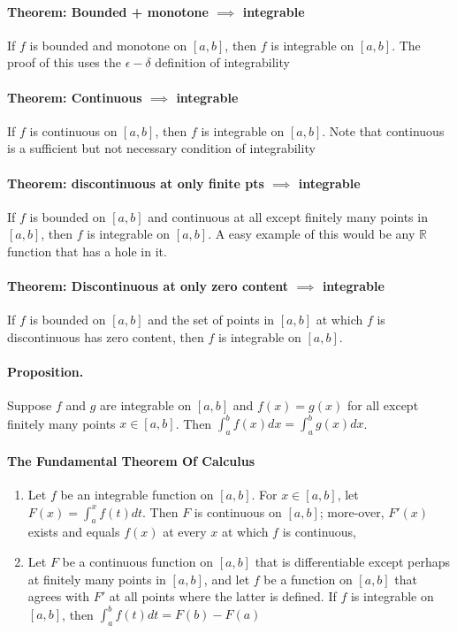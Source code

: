 \documentclass[11pt]{article}
\begin{document}
\paragraph{Theorem: Bounded + monotone $\implies$ integrable} If $f$ is bounded and monotone on $[a,b]$, then $f$ is integrable on $[a,b]$. The proof of this uses the $\epsilon-\delta$ definition of integrability

\paragraph{Theorem: Continuous $\implies$ integrable} If $f$ is continuous on $[a,b]$, then $f$ is integrable on $[a,b]$. Note that continuous is a sufficient but not necessary condition of integrability

\paragraph{Theorem: discontinuous at only finite pts $\implies$ integrable} If $f$ is bounded on $[a,b]$ and continuous at all except finitely many points in $[a,b]$, then $f$ is integrable on $[a,b]$. A easy example of this would be any $\mathbb{R}$ function that has a hole in it.

\paragraph{Theorem: Discontinuous at only zero content $\implies$ integrable} If $f$ is bounded on $[a,b]$ and the set of points in $[a,b]$ at which $f$ is discontinuous has zero content, then $f$ is integrable on $[a,b]$.

\paragraph{Proposition.} Suppose $f$ and $g$ are integrable on $[a,b]$ and $f(x) = g(x)$ for all except finitely many points $x\in [a,b]$. Then $\int_a^bf(x)dx = \int_a^bg(x)dx$. 

\paragraph{The Fundamental Theorem Of Calculus}
\begin{enumerate}
    \item Let $f$ be an integrable function on $[a,b]$. For $x\in [a,b]$, let $F(x) = \int_a^xf(t)dt$. Then $F$ is continuous on $[a,b]$; more-over, $F'(x)$ exists and equals $f(x)$ at every $x$ at which $f$ is continuous,
    \item Let $F$ be a continuous function on $[a,b]$ that is differentiable except perhaps at finitely many points in $[a,b]$, and let $f$ be a function on $[a,b]$ that agrees with $F'$ at all points where the latter is defined. If $f$ is integrable on $[a,b]$, then $\int_a^bf(t)dt=F(b)-F(a)$
\end{enumerate}
\end{document}
